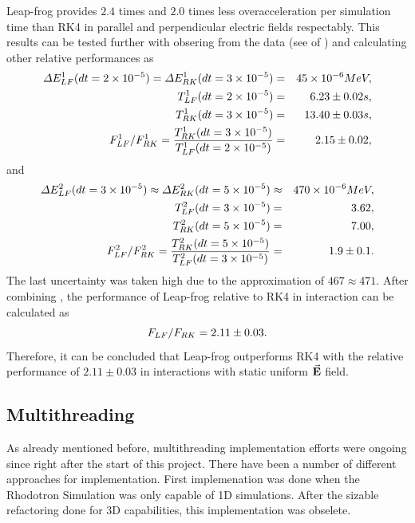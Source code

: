 \documentclass[a4paper,oneside,12pt]{report}
\numberwithin{equation}{chapter}
\begin{document}
{Leap-frog provides $2.4$ times and $2.0$ times less overacceleration per simulation time than 
RK4 in parallel and perpendicular electric fields respectably.
This results can be tested further with obsering from the data (see  of )
and calculating other relative performances as
\vspace{-10pt}\begin{eqnarray} \label{eq:f_lf_rk_3}
    \Delta E_{LF}^1 (dt=2 \times 10^{-5}) = \Delta E_{RK}^1 (dt=3 \times 10^{-5}) &=& 45 \times 10^{-6} MeV, \\
    T_{LF}^1(dt=2 \times 10^{-5})  &=& 6.23 \pm 0.02 s, \\ %
    T_{RK}^1(dt=3 \times 10^{-5})  &=& 13.40 \pm 0.03 s, \\ %
    F_{LF}^1/F_{RK}^1 = \frac{T_{RK}^1(dt=3 \times 10^{-5})}{T_{LF}^1(dt=2 \times 10^{-5})} &=& 2.15 \pm 0.02,
\vspace{-10pt}\end{eqnarray}
and
\vspace{-10pt}\begin{eqnarray} \label{eq:f_lf_rk_4}
    \Delta E_{LF}^2 (dt=3 \times 10^{-5}) \approx \Delta E_{RK}^2 (dt=5 \times 10^{-5}) &\approx& 470 \times 10^{-6} MeV, \\
    T_{LF}^2(dt=3 \times 10^{-5})  &=& 3.62, \\ %
    T_{RK}^2(dt=5 \times 10^{-5})  &=& 7.00, \\ %
    F_{LF}^2/F_{RK}^2 = \frac{T_{RK}^2(dt=5 \times 10^{-5})}{T_{LF}^2(dt=3 \times 10^{-5})} &=& 1.9 \pm 0.1.
\vspace{-10pt}\end{eqnarray}
The last uncertainty was taken high due to the approximation of $467 \approx 471$. After combining ,
the performance of Leap-frog relative to RK4 in \eE interaction can be calculated as
\vspace{-10pt}\begin{equation}\label{eq:lf_rk_eE_relative_performance}
    F_{LF}/F_{RK} = 2.11 \pm 0.03.
\vspace{-10pt}\end{equation}
Therefore, it can be concluded that Leap-frog outperforms RK4 with the relative performance of $2.11 \pm 0.03$ in \eE interactions with static uniform $\vec{\textbf{E}}$ field. 

\subsection{Multithreading}
As already mentioned before, multithreading implementation efforts were ongoing since right after the start of this project. 
There have been a number of different approaches for implementation. 
First implemenation was done when the Rhodotron Simulation was only capable of 1D simulations.
After the sizable refactoring done for 3D capabilities, this implementation was obselete. 

}
\end{document}
